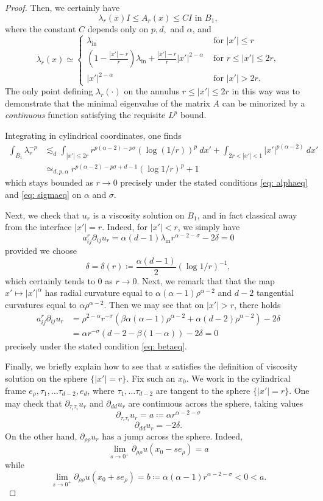 \documentclass[10pt,a4paper]{amsart}
\begin{document}
\begin{proof}
Then, we certainly have
$$\lambda_r(x) I \le A_r(x)\le C I \text{ in } B_1,$$
where the constant $C$ depends only on $p,d,$ and $\alpha$, and
$$\lambda_r(x) \simeq \begin{cases} \lambda_{\text{in}}& \text{ for } |x'| \le r\\
(1-\frac{|x'|-r}{r})\lambda_{\text{in}} + \frac{|x'|-r}{r} |x'|^{2-\alpha} & \text{ for } r\le |x'| \le 2r,\\
|x'|^{2-\alpha} & \text{ for } |x'|>2r.
\end{cases}$$
The only point defining $\lambda_r(\cdot)$ on the annulus $r\le |x'| \le 2r$ in this way was to demonstrate that the minimal eigenvalue of the matrix $A$ can be minorized by a \textit{continuous} function satisfying the requisite $L^p$ bound. 

Integrating in cylindrical coordinates, one finds 
\begin{align} \int_{B_1} \lambda_r^{-p} &\lesssim_d \int_{|x'| \le 2r} r^{p(\alpha-2) - p\sigma}(\log(1/r))^p \ dx' + \int_{2r <|x'| <1} |x'|^{p(\alpha-2)} \ dx'\\
& \simeq_{d,p,\alpha} r^{p(\alpha-2) - p\sigma+ d-1}(\log 1/r)^{p} + 1
\end{align}
which stays bounded as $r\to 0$ precisely under the stated conditions \eqref{eq: alphaeq} and \eqref{eq: sigmaeq} on $\alpha$ and $\sigma$. 

Next, we check that $u_r$ is a viscosity solution on $B_1$, and in fact classical away from the interface $|x'|=r$. Indeed, for $|x'| <  r$, we simply have
$$a_{ij}^r \partial_{ij}u_r = \alpha  (d-1)\lambda_{\text{in}} r^{\alpha-2-\sigma} - 2 \delta=0$$
provided we choose
$$\delta = \delta(r) \coloneqq \frac{\alpha(d-1)}{2} (\log 1/r)^{-1}, $$
which certainly tends to $0$ as $r\to 0$. Next, we remark that that the map $x' \mapsto |x'|^\alpha$ has radial curvature equal to  $\alpha(\alpha -1) \rho^{\alpha-2}$ and $d-2$ tangential curvatures equal to $\alpha \rho^{\alpha-2}$. Then we may see that on $|x'|>r$, there holds
\begin{align} a_{ij}^r \partial_{ij}u_r &= \rho^{2-\alpha}r^{-\sigma}\left(\beta \alpha(\alpha-1) \rho^{\alpha -2} + \alpha(d-2) \rho^{\alpha -2}\right) - 2\delta\\
&= \alpha r^{-\sigma}(d-2 - \beta(1-\alpha)) - 2\delta =0
\end{align}
precisely under the stated condition \eqref{eq: betaeq}.

Finally, we briefly explain how to see that $u$ satisfies the definition of viscosity solution on the sphere $\{|x'|=r\}$. Fix such an $x_0$. We work in the cylindrical frame $e_\rho, \tau_1, \ldots \tau_{d-2}, e_d$, where $\tau_1, \ldots \tau_{d-2}$ are tangent to the sphere $\{|x'|=r\}$. One may check that $\partial_{\tau_i \tau_i} u_r$ and $\partial_{dd}u_r$ are continuous across the sphere, taking values
$$\partial_{\tau_i \tau_i} u_r = a \coloneqq \alpha r^{\alpha -2-\sigma}$$
$$\partial_{dd}u_r = -2\delta.$$
On the other hand, $\partial_{\rho \rho} u_r$ has a jump across the sphere. Indeed, 
$$\lim_{s \to 0^+} \partial_{\rho\rho}u(x_0 - se_\rho) = a$$
while
$$\lim_{s \to 0^+} \partial_{\rho\rho}u(x_0+ se_\rho) = b \coloneqq \alpha(\alpha-1)r^{\alpha-2-\sigma} <0<a.$$


\end{proof}
\end{document}
